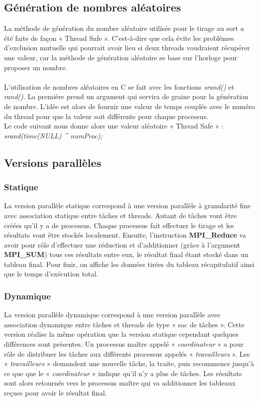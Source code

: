 \documentclass[a4paper,12pt]{article}
\begin{document}
\subsection{Génération de nombres aléatoires}
La méthode de génération du nombre aléatoire utilisée pour le tirage au sort a été faite de façon « Thread Safe ». C'est-à-dire que cela évite les problèmes d'exclusion mutuelle qui pourrait avoir lieu si deux threads voudraient récupérer une valeur, car la méthode de génération aléatoire se base sur l'horloge pour proposer un nombre.\\\\
\indent L'utilisation de nombres aléatoires en C se fait avec les fonctions \textit{srand()} et \textit{rand()}. La première prend un argument qui servira de graine pour la génération de nombre. L'idée est alors de fournir une valeur de temps couplée avec le numéro du thread pour que la valeur soit différente pour chaque processus. \\
Le code suivant nous donne alors une valeur aléatoire « Thread Safe » : \\
\textit{srand(time(NULL) {\large \textasciicircum}  numProc);}


\subsection{Versions parallèles}

\subsubsection{Statique}
La version parallèle statique correspond à une version parallèle à granularité fine avec association statique entre tâches et threads. Autant de tâches vont être créées qu'il y a de processus. Chaque processus fait effectuer le tirage et les résultats vont être stockés localement. Ensuite, l'instruction \textbf{MPI\_Reduce} va avoir pour rôle d'effectuer une réduction et d'additionner (grâce à l'argument \textbf{MPI\_SUM}) tous ces résultats entre eux, le résultat final étant stocké dans un tableau final. Pour finir, on affiche les données tirées du tableau récapitulatif ainsi que le temps d'exécution total. 

\subsubsection{Dynamique}
La version parallèle dynamique correspond à une version parallèle avec association dynamique entre tâches et threads de type « sac de tâches ». Cette version réalise la même opération que la version statique cependant quelques différences sont présentes. Un processus maître appelé « \textit{coordinateur} » a pour rôle de distribuer les tâches aux différents processus appelés « \textit{travailleurs} ». Les « \textit{travailleurs} » demandent une nouvelle tâche, la traite, puis recommence jusqu'à ce que que le « \textit{coordinateur} » indique qu'il n'y a plus de tâches. Les résultats sont alors retournés vers le processus maître qui va additionner les tableaux reçues pour avoir le résultat final.
\end{document}
